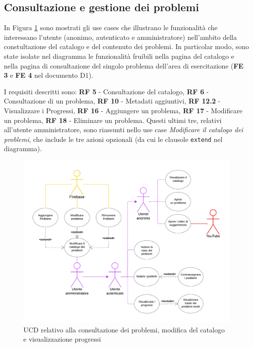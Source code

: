 \documentclass[11pt, a4paper]{article}
\theoremstyle{definition} %
\begin{document}
\newpage
\subsection{Consultazione e gestione dei problemi}\label{consultazione}
In Figura \ref{catalogueprobs} sono mostrati gli use cases che illustrano
le funzionalità che interessano l'utente (anonimo, autenticato e amministratore)
nell'ambito della constultazione del catalogo e del contenuto
dei problemi. In particolar modo, sono state isolate nel diagramma le funzionalità
fruibili nella pagina del catalogo e nella pagina di consultazione
del singolo problema dell'area di esercitazione (\textbf{FE 3} e \textbf{FE 4}
nel documento D1).

I requisiti descritti sono: \textbf{RF 5} - Consultazione del catalogo,
\textbf{RF 6} - Consultazione di un problema, \textbf{RF 10} - Metadati aggiuntivi,
\textbf{RF 12.2} - Visualizzare i Progressi, \textbf{RF 16} - Aggiungere un problema,
\textbf{RF 17} - Modificare un problema, \textbf{RF 18} - Eliminare un problema.
Questi ultimi tre, relativi all'utente amministratore, sono riassunti nello use case
\textit{Modificare il catalogo dei problemi}, che include le tre azioni opzionali (da
cui le clausole \texttt{extend} nel diagramma).


\begin{figure}[H]
\centering
\hspace*{-1.7cm}
\includegraphics[scale=0.76]{materiale/ucdiagrams/ucproblemi.pdf}
\caption{UCD relativo alla consultazione dei problemi, modifica del catalogo e visualizzazione progressi}
\label{catalogueprobs}
\end{figure}
\end{document}

